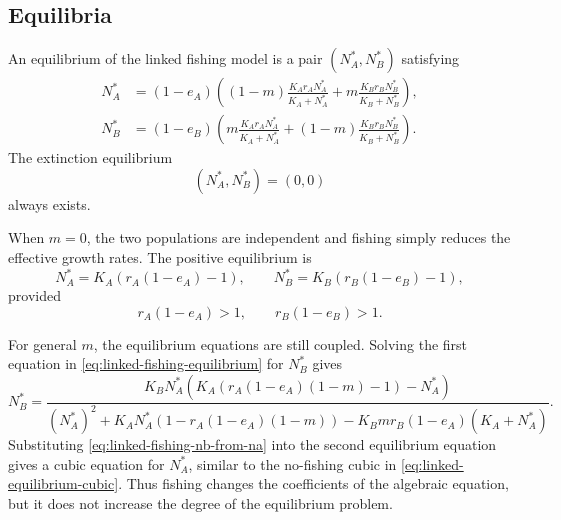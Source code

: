 \documentclass{article}
\numberwithin{equation}{section}
\begin{document}
\subsection{Equilibria}
An equilibrium of the linked fishing model is a pair
$(N_A^*,N_B^*)$ satisfying
\begin{equation}
    \label{eq:linked-fishing-equilibrium}
    \begin{aligned}
        N_A^*
            &= (1-e_A)
            \left(
                (1-m)\frac{K_A r_A N_A^*}{K_A+N_A^*}
                +m\frac{K_B r_B N_B^*}{K_B+N_B^*}
            \right),\\
        N_B^*
            &= (1-e_B)
            \left(
                m\frac{K_A r_A N_A^*}{K_A+N_A^*}
                +(1-m)\frac{K_B r_B N_B^*}{K_B+N_B^*}
            \right).
    \end{aligned}
\end{equation}
The extinction equilibrium
\begin{equation*}
    (N_A^*,N_B^*)=(0,0)
\end{equation*}
always exists.

When $m=0$, the two populations are independent and fishing simply
reduces the effective growth rates. The positive equilibrium is
\begin{equation*}
    N_A^*=K_A(r_A(1-e_A)-1),
    \qquad
    N_B^*=K_B(r_B(1-e_B)-1),
\end{equation*}
provided
\begin{equation*}
    r_A(1-e_A)>1,
    \qquad
    r_B(1-e_B)>1.
\end{equation*}

For general $m$, the equilibrium equations are still coupled. Solving
the first equation in \eqref{eq:linked-fishing-equilibrium} for
$N_B^*$ gives
\begin{equation}
    \label{eq:linked-fishing-nb-from-na}
    N_B^*
    =
    \frac{
        K_BN_A^*
        \left(K_A(r_A(1-e_A)(1-m)-1)-N_A^*\right)
    }{
        (N_A^*)^2
        +K_AN_A^*\left(1-r_A(1-e_A)(1-m)\right)
        -K_Bmr_B(1-e_A)(K_A+N_A^*)
    }.
\end{equation}
Substituting \eqref{eq:linked-fishing-nb-from-na} into the second
equilibrium equation gives a cubic equation for $N_A^*$, similar to the
no-fishing cubic in \eqref{eq:linked-equilibrium-cubic}. Thus fishing
changes the coefficients of the algebraic equation, but it does not
increase the degree of the equilibrium problem.
\end{document}
